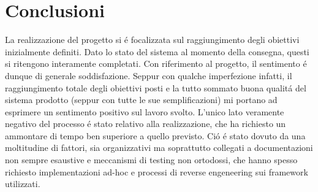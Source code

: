 \section{Conclusioni}
La realizzazione del progetto si \'e focalizzata sul raggiungimento degli obiettivi inizialmente definiti. Dato lo stato del sistema al momento della consegna, questi si ritengono interamente completati. Con riferimento al progetto, il sentimento \'e dunque di generale soddisfazione. Seppur con qualche imperfezione infatti, il raggiungimento totale degli obiettivi posti e la tutto sommato buona qualit\'a del sistema prodotto (seppur con tutte le sue semplificazioni) mi portano ad esprimere un sentimento positivo sul lavoro svolto. L'unico lato veramente negativo del processo \'e stato relativo alla realizzazione, che ha richiesto un ammontare di tempo ben superiore a quello previsto. Ci\'o \'e stato dovuto da una moltitudine di fattori, sia organizzativi ma soprattutto collegati a documentazioni non sempre esaustive e meccanismi di testing non ortodossi, che hanno spesso richiesto implementazioni ad-hoc e processi di reverse engeneering sui framework utilizzati.

